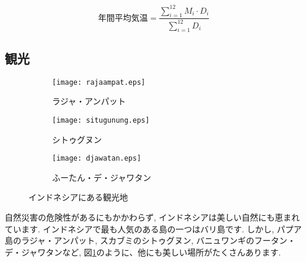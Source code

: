 \documentclass[a4j, twocolumn]{jarticle}
\begin{document}
  \[
  \text{年間平均気温} = \frac{\sum_{i=1}^{12} M_i \cdot D_i}{\sum_{i=1}^{12} D_i}
  \]


  \subsection{観光}
  \begin{figure}[h]
    \centering
    \begin{subfigure}[b]{0.3\textwidth}
      \texttt{[image: rajaampat.eps]}
      \caption{ラジャ・アンパット}
    \end{subfigure}
    \hfill
    \begin{subfigure}[b]{0.3\textwidth}
      \texttt{[image: situgunung.eps]}
      \caption{シトゥグヌン}
    \end{subfigure}
    \hfill
    \begin{subfigure}[b]{0.3\textwidth}
      \texttt{[image: djawatan.eps]}
      \caption{ふーたん・デ・ジャワタン}
    \end{subfigure}
    \caption{インドネシアにある観光地}\label{tourism}
  \end{figure}
  自然災害の危険性があるにもかかわらず, インドネシアは美しい自然にも恵まれています. インドネシアで最も人気のある島の一つはバリ島です. しかし, パプア島のラジャ・アンパット, スカブミのシトゥグヌン, バニュワンギのフータン・デ・ジャワタンなど, 図\ref{tourism}のように、他にも美しい場所がたくさんあります\cite{klook2023pemandangan}.

  
  
\end{document}
